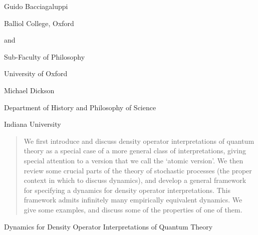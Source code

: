 \documentclass[12pt]{article}
\begin{document}
\baselineskip 12pt

\thispagestyle{empty}
\begin{center}

\vspace*{20pt}


\vspace{40pt}
\noindent Guido Bacciagaluppi

\noindent Balliol College, Oxford

\noindent and

\noindent Sub-Faculty of Philosophy

\noindent University of Oxford

\vspace{20pt}
\noindent Michael Dickson

\noindent Department of History and Philosophy of Science

\noindent Indiana University

\vspace{20pt}
\end{center}

\begin{quotation}
\noindent We first introduce and discuss density operator 
interpretations of quantum theory as a special case of a more general 
class of interpretations, giving special attention to a version that 
we call the `atomic version'.  We then review some crucial parts of 
the theory of stochastic processes (the proper context in which to 
discuss dynamics), and develop a general framework for specifying a 
dynamics for density operator interpretations.  This framework admits 
infinitely many empirically equivalent dynamics.  We give some 
examples, and discuss some of the properties of one of them.
\end{quotation}

\newpage

\setcounter{page}{1}
\thispagestyle{empty}

\begin{center}


\vspace{12pt}

\noindent Dynamics for Density Operator Interpretations of Quantum 
Theory

\vspace{20pt}
\end{center}
\end{document}

